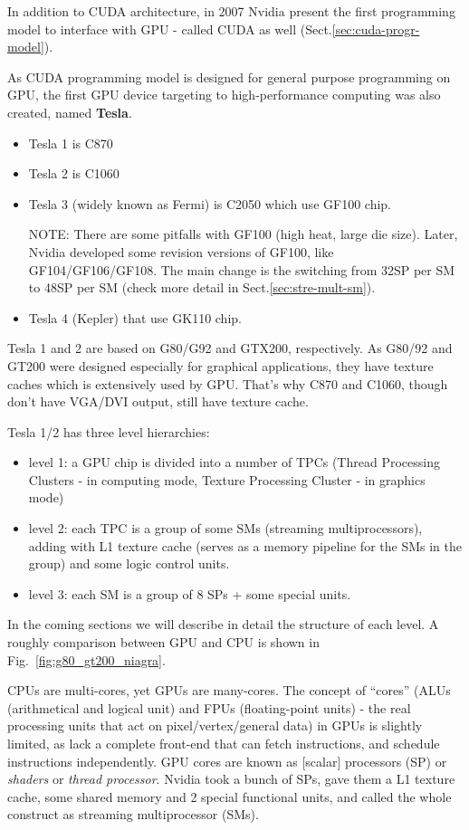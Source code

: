 In addition to CUDA architecture, in 2007 Nvidia present the first programming
model to interface with GPU - called CUDA as well
(Sect.\ref{sec:cuda-progr-model}).

As CUDA programming model is designed for general purpose programming on GPU,
the first GPU device targeting to high-performance computing was also created, named
{\bf Tesla}.
\begin{itemize}
\item Tesla 1 is C870
\item Tesla 2 is C1060
\item Tesla 3 (widely known as Fermi) is C2050 which use GF100 chip.

NOTE: There are some pitfalls with GF100 (high heat, large die size). Later,
Nvidia developed some revision versions of GF100, like GF104/GF106/GF108. The
main change is the switching from 32SP per SM to 48SP per SM (check more detail
in Sect.\ref{sec:stre-mult-sm}).

\item Tesla 4 (Kepler) that use GK110 chip.
\end{itemize}


\begin{framed}
  Tesla 1 and 2 are based on G80/G92 and GTX200, respectively. As
  G80/92 and GT200 were designed especially for graphical
  applications, they have texture caches which is extensively used by
  GPU. That's why C870 and C1060, though don't have VGA/DVI output,
  still have texture cache.
\end{framed}

Tesla 1/2 has three level hierarchies:
\begin{itemize}
\item level 1: a GPU chip is divided into a number of TPCs (Thread
  Processing Clusters - in computing mode, Texture Processing Cluster
  - in graphics mode)
\item level 2: each TPC is a group of some SMs (streaming
  multiprocessors), adding with L1 texture cache (serves as a memory
  pipeline for the SMs in the group) and some logic control units.
\item level 3: each SM is a group of 8 SPs + some special units.
\end{itemize}
In the coming sections we will describe in detail the structure of
each level. A roughly comparison between GPU and CPU is shown in
Fig.~\ref{fig:g80_gt200_niagra}. 

\begin{framed}
  CPUs are multi-cores, yet GPUs are many-cores.  The concept of
  ``cores'' (ALUs (arithmetical and logical unit) and FPUs
  (floating-point units) - the real processing units that act on
  pixel/vertex/general data) in GPUs is slightly limited, as lack a
  complete front-end that can fetch instructions, and schedule
  instructions independently. GPU cores are known as [scalar]
  processors (SP) or {\it shaders} or {\it thread processor}.  Nvidia
  took a bunch of SPs, gave them a L1 texture cache, some shared
  memory and 2 special functional units, and called the whole
  construct as streaming multiprocessor (SMs).
\end{framed}


